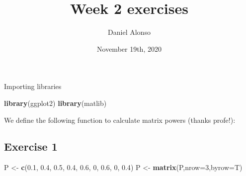 \documentclass[]{article}
\title{Week 2 exercises}
\author{Daniel Alonso}
\date{November 19th, 2020}
\newenvironment{Shaded}{\begin{snugshade}}{\end{snugshade}}
\newcommand{\CommentTok}[1]{\textcolor[rgb]{0.56,0.35,0.01}{\textit{#1}}}
\newcommand{\ControlFlowTok}[1]{\textcolor[rgb]{0.13,0.29,0.53}{\textbf{#1}}}
\newcommand{\DataTypeTok}[1]{\textcolor[rgb]{0.13,0.29,0.53}{#1}}
\newcommand{\DecValTok}[1]{\textcolor[rgb]{0.00,0.00,0.81}{#1}}
\newcommand{\FloatTok}[1]{\textcolor[rgb]{0.00,0.00,0.81}{#1}}
\newcommand{\KeywordTok}[1]{\textcolor[rgb]{0.13,0.29,0.53}{\textbf{#1}}}
\newcommand{\NormalTok}[1]{#1}
\newcommand{\OperatorTok}[1]{\textcolor[rgb]{0.81,0.36,0.00}{\textbf{#1}}}
\newcommand{\StringTok}[1]{\textcolor[rgb]{0.31,0.60,0.02}{#1}}
\begin{document}
\maketitle

Importing libraries

\begin{Shaded}
\begin{Highlighting}[]
\KeywordTok{library}\NormalTok{(ggplot2)}
\KeywordTok{library}\NormalTok{(matlib)}
\end{Highlighting}
\end{Shaded}

We define the following function to calculate matrix powers (thanks
profe!):

\begin{Shaded}
\end{Shaded}

\hypertarget{exercise-1}{%
\subsection{Exercise 1}\label{exercise-1}}

\begin{Shaded}
\begin{Highlighting}[]
\NormalTok{P <-}\StringTok{ }\KeywordTok{c}\NormalTok{(}\FloatTok{0.1}\NormalTok{, }\FloatTok{0.4}\NormalTok{, }\FloatTok{0.5}\NormalTok{,}
       \FloatTok{0.4}\NormalTok{, }\FloatTok{0.6}\NormalTok{,   }\DecValTok{0}\NormalTok{,}
       \FloatTok{0.6}\NormalTok{,   }\DecValTok{0}\NormalTok{, }\FloatTok{0.4}\NormalTok{)}
\NormalTok{P <-}\StringTok{ }\KeywordTok{matrix}\NormalTok{(P,}\DataTypeTok{nrow=}\DecValTok{3}\NormalTok{,}\DataTypeTok{byrow=}\NormalTok{T)}
\end{Highlighting}
\end{Shaded}
\end{document}
